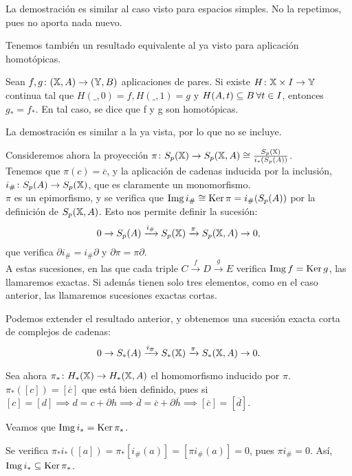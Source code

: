 La demostración es similar al caso visto para espacios simples. No la repetimos, pues no aporta nada nuevo.

Tenemos también un resultado equivalente al ya visto para aplicación homotópicas.

\begin{proposition}
  Sean $f, g \colon ({\mathbb X}, A) \to ({\mathbb Y}, B)$ aplicaciones de pares. Si existe $H \colon {\mathbb X} \times I \to {\mathbb Y}$ continua tal que
  $H(\_, 0) = f, H(\_, 1) = g$ y $H(A, t) \subseteq B \hspace{0.2em} \forall t \in I$, entonces $g_* = f_*$. En tal caso, se dice que
  f y g son homotópicas.
\end{proposition}

La demostración es similar a la ya vista, por lo que no se incluye.

Consideremos ahora la proyección $\pi \colon S_{p}({\mathbb X}) \to S_p({\mathbb X}, A) \cong \frac{S_{p}({\mathbb X})}{i_*(S_p(A))}$. \\
Tenemos que $\pi(c) = \overline{c}$, y la aplicación de cadenas inducida por la inclusión,
$i_\# \colon S_p(A) \to S_{p}({\mathbb X})$, que es claramente un monomorfismo. \\
$\pi$ es un epimorfismo, y se verifica que $\operatorname{Img} i_\# \cong \operatorname{Ker} \pi = i_\#(S_p(A))$ por la definición de $S_p({\mathbb X}, A)$.
Esto nos permite definir la sucesión:
\[0 \to S_p(A) \xrightarrow{i_\#} S_{p}({\mathbb X}) \xrightarrow{\pi} S_p({\mathbb X}, A) \to 0, \]
que verifica $\partial i_\# = i_\# \partial$ y $\partial \pi = \pi \partial$. \\
A estas sucesiones, en las que cada triple $C \xrightarrow{f} D \xrightarrow{g} E$ verifica $\operatorname{Img} f = \operatorname{Ker} g$, las llamaremos exactas.
Si además tienen solo tres elementos, como en el caso anterior, las llamaremos sucesiones exactas cortas.

Podemos extender el resultado anterior, y obtenemos una sucesión exacta corta de complejos de cadenas:
\[0 \to S_*(A) \xrightarrow{i_\#} S_*({\mathbb X}) \xrightarrow{\pi} S_*({\mathbb X}, A) \to 0. \]

Sea ahora $\pi_* \colon H_*({\mathbb X}) \to H_*({\mathbb X}, A)$ el homomorfismo inducido por $\pi$. \\
$\pi_*([c]) = [\overline{c}]$ que está bien definido, pues si $[c] = [d] \implies d = c + \partial h \implies \overline{d} = \overline{c} + \partial \overline{h}
\implies [\overline{c}] = [\overline{d}]$.

Veamos que $\operatorname{Img} i_* = \operatorname{Ker} \pi_*$.

Se verifica $\pi_* i_* ([a]) = \pi_*[i_\#(a)] = [\pi i_\#(a)] = 0$, pues $\pi i_\# = 0$. Así, $\operatorname{Img} i_* \subseteq \operatorname{Ker} \pi_*$.

